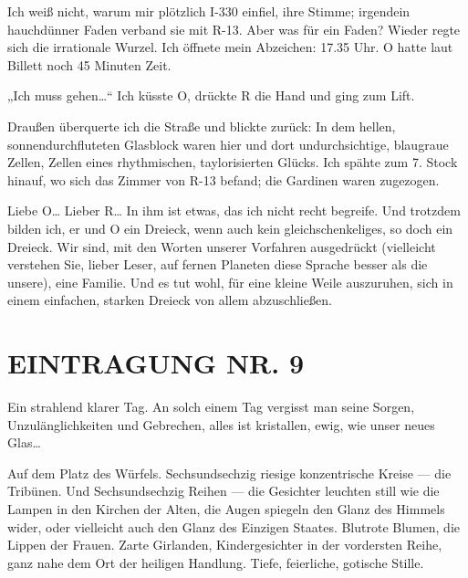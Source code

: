 Ich weiß nicht, warum mir plötzlich I-330 einfiel, ihre Stimme;
irgendein hauchdünner Faden verband sie mit R-13. Aber was für ein
Faden? Wieder regte sich die irrationale Wurzel. Ich öffnete mein
Abzeichen: 17.35 Uhr. O hatte laut Billett noch 45 Minuten Zeit.

„Ich muss gehen\ldots{}“ Ich küsste O, drückte R die Hand und ging zum
Lift.

Draußen überquerte ich die Straße und blickte zurück: In dem
hellen, sonnendurchfluteten Glasblock waren hier und dort
undurchsichtige, blaugraue Zellen, Zellen eines rhythmischen,
taylorisierten Glücks. Ich spähte zum 7. Stock hinauf, wo sich das
Zimmer von R-13 befand; die Gardinen waren zugezogen.

Liebe O\ldots{} Lieber R\ldots{} In ihm ist etwas, das ich nicht recht
begreife. Und trotzdem bilden ich, er und O ein Dreieck, wenn auch
kein gleichschenkeliges, so doch ein Dreieck. Wir sind, mit den
Worten unserer Vorfahren ausgedrückt (vielleicht verstehen Sie,
lieber Leser, auf fernen Planeten diese Sprache besser als die
unsere), eine Familie. Und es tut wohl, für eine kleine Weile
auszuruhen, sich in einem einfachen, starken Dreieck von allem
abzuschließen.

\section{EINTRAGUNG NR. 9}

Ein strahlend klarer Tag. An solch einem Tag vergisst man seine
Sorgen, Unzulänglichkeiten und Gebrechen, alles ist kristallen,
ewig, wie unser neues Glas\ldots{}

Auf dem Platz des Würfels.
Sechsundsechzig riesige konzentrische Kreise — die Tribünen. Und
Sechsundsechzig Reihen — die Gesichter leuchten still wie die Lampen in den Kirchen
der Alten, die Augen spiegeln den Glanz des Himmels wider, oder
vielleicht auch den Glanz des Einzigen Staates. Blutrote Blumen,
die Lippen der Frauen. Zarte Girlanden, Kindergesichter in der
vordersten Reihe, ganz nahe dem Ort der heiligen Handlung. Tiefe,
feierliche, gotische Stille.

